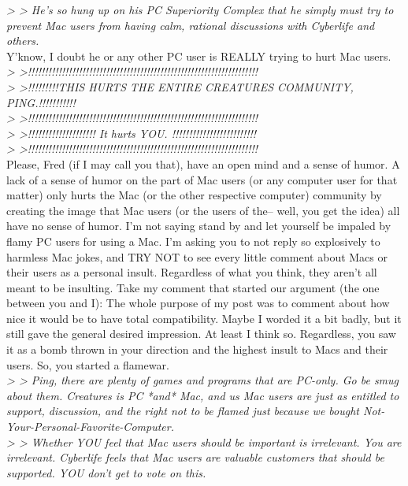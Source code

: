 \documentclass[11pt,twoside,a4paper]{article}
\begin{document}
\begin{multicols*}{2}
\emph{> > He's so hung up on his PC Superiority Complex that he simply must try to prevent Mac users from having calm, rational discussions with Cyberlife and others.}~\\

Y'know, I doubt he or any other PC user is REALLY trying to hurt Mac users.~\\

\emph{> >!!!!!!!!!!!!!!!!!!!!!!!!!!!!!!!!!!!!!!!!!!!!!!!!!!!!!!!!!!!!!!!!!!!!}~\\
\emph{> >!!!!!!!!!THIS HURTS THE ENTIRE CREATURES COMMUNITY, PING.!!!!!!!!!!!}~\\
\emph{> >!!!!!!!!!!!!!!!!!!!!!!!!!!!!!!!!!!!!!!!!!!!!!!!!!!!!!!!!!!!!!!!!!!!!}~\\
\emph{> >!!!!!!!!!!!!!!!!!!!!     It hurts YOU.     !!!!!!!!!!!!!!!!!!!!!!!!!}~\\
\emph{> >!!!!!!!!!!!!!!!!!!!!!!!!!!!!!!!!!!!!!!!!!!!!!!!!!!!!!!!!!!!!!!!!!!!!}~\\

Please, Fred (if I may call you that), have an open mind and a sense of humor. A lack of a sense of humor on the part of Mac users (or any computer user for that matter) only hurts the Mac (or the other respective computer) community by creating the image that Mac users (or the users of the-- well, you get the idea) all have no sense of humor. I'm not saying stand by and let yourself be impaled by flamy PC users for using a Mac. I'm asking you to not reply so explosively to harmless Mac jokes, and TRY NOT to see every little comment about Macs or their users as a personal insult. Regardless of what you think, they aren't all meant to be insulting. Take my comment that started our argument (the one between you and I): The whole purpose of my post was to comment about how nice it would be to have total compatibility. Maybe I worded it a bit badly, but it still gave the general desired impression. At least I think so. Regardless, you saw it as a bomb thrown in your direction and the highest insult to Macs and their users. So, you started a flamewar.~\\

\emph{> > Ping, there are plenty of games and programs that are PC-only. Go be smug about them. Creatures is PC *and* Mac, and us Mac users are just as entitled to support, discussion, and the right not to be flamed just because we bought Not-Your-Personal-Favorite-Computer.}~\\

\emph{> > Whether YOU feel that Mac users should be important is irrelevant. You are irrelevant. Cyberlife feels that Mac users are valuable customers that should be supported. YOU don't get to vote on this.}~\\


\end{multicols*}
\end{document}

